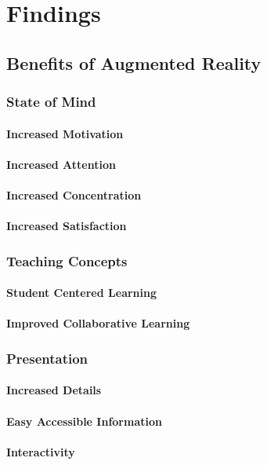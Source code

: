 \section{Findings}
\subsection{Benefits of Augmented Reality}
\subsubsection{State of Mind}
\paragraph{Increased Motivation}
\paragraph{Increased Attention}
\paragraph{Increased Concentration}
\paragraph{Increased Satisfaction}
\subsubsection{Teaching Concepts}
\paragraph{Student Centered Learning}
\paragraph{Improved Collaborative Learning}
\subsubsection{Presentation}
\paragraph{Increased Details}
\paragraph{Easy Accessible Information}
\paragraph{Interactivity}
